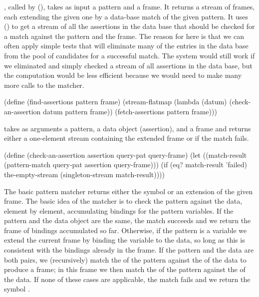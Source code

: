 , called by  (),
takes as input a pattern and a frame.  It returns a stream of frames, each
extending the given one by a data-base match of the given pattern.  It uses
 () to get a stream of all the
assertions in the data base that should be checked for a match against the
pattern and the frame.  The reason for  here is that we
can often apply simple tests that will eliminate many of the entries in the
data base from the pool of candidates for a successful match.  The system would
still work if we eliminated  and simply checked a stream
of all assertions in the data base, but the computation would be less efficient
because we would need to make many more calls to the matcher.

\begin{codeBlock}
(define (find-assertions pattern frame)
  (stream-flatmap
   (lambda (datum) (check-an-assertion datum pattern frame))
   (fetch-assertions pattern frame)))
\end{codeBlock}

\noindent
{} takes as arguments a pattern, a data object
(assertion), and a frame and returns either a one-element stream containing the
extended frame or  if the match fails.

\begin{codeBlock}
(define (check-an-assertion assertion query-pat query-frame)
  (let ((match-result
         (pattern-match query-pat assertion query-frame)))
    (if (eq? match-result 'failed)
        the-empty-stream
        (singleton-stream match-result))))
\end{codeBlock}

\noindent
The basic pattern matcher returns either the symbol  or an
extension of the given frame.  The basic idea of the matcher is to check the
pattern against the data, element by element, accumulating bindings for the
pattern variables.  If the pattern and the data object are the same, the match
succeeds and we return the frame of bindings accumulated so far.  Otherwise, if
the pattern is a variable we extend the current frame by binding the variable
to the data, so long as this is consistent with the bindings already in the
frame.  If the pattern and the data are both pairs, we (recursively) match the
 of the pattern against the  of the data to produce a
frame; in this frame we then match the  of the pattern against the
 of the data.  If none of these cases are applicable, the match fails
and we return the symbol .

